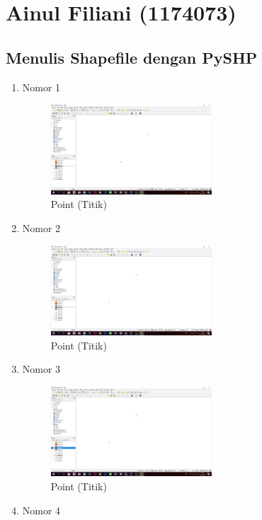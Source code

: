 \section{Ainul Filiani (1174073)}
\subsection{Menulis Shapefile dengan PySHP}
\begin{enumerate}
	\item Nomor 1
	
	\begin{figure}[H]
		\includegraphics[width=6cm]{figures/Tugas2/1174073/No1.png}
		\centering
		\caption{Point (Titik)}
	\end{figure}
	\item Nomor 2
	
	\begin{figure}[H]
		\includegraphics[width=6cm]{figures/Tugas2/1174073/No2.png}
		\centering
		\caption{Point (Titik)}
	\end{figure}
	\item Nomor 3
	
	\begin{figure}[H]
		\includegraphics[width=6cm]{figures/Tugas2/1174073/No3.png}
		\centering
		\caption{Point (Titik)}
	\end{figure}
	\item Nomor 4
	

\end{enumerate}
